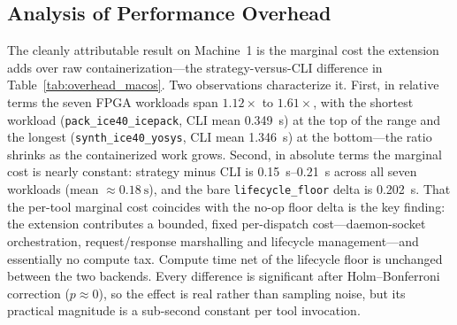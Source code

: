 \subsection{Analysis of Performance Overhead}
\label{subsec:overhead_analysis}
The cleanly attributable result on Machine~1 is the marginal cost the extension adds over raw containerization---the strategy-versus-CLI difference in Table~\ref{tab:overhead_macos}. Two observations characterize it. First, in relative terms the seven FPGA workloads span $1.12\times$ to $1.61\times$, with the shortest workload (\texttt{pack\_ice40\_icepack}, CLI mean \SI{0.349}{\second}) at the top of the range and the longest (\texttt{synth\_ice40\_yosys}, CLI mean \SI{1.346}{\second}) at the bottom---the ratio shrinks as the containerized work grows. Second, in absolute terms the marginal cost is nearly constant: strategy minus CLI is \SIrange{0.15}{0.21}{\second} across all seven workloads (mean $\approx \SI{0.18}{\second}$), and the bare \texttt{lifecycle\_floor} delta is \SI{0.202}{\second}. That the per-tool marginal cost coincides with the no-op floor delta is the key finding: the extension contributes a bounded, fixed per-dispatch cost---daemon-socket orchestration, request/response marshalling and lifecycle management---and essentially no compute tax. Compute time net of the lifecycle floor is unchanged between the two backends. Every difference is significant after Holm--Bonferroni correction ($p \approx 0$), so the effect is real rather than sampling noise, but its practical magnitude is a sub-second constant per tool invocation.

